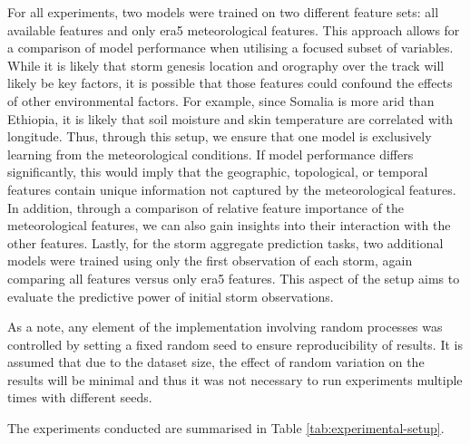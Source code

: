 For all experiments, two models were trained on two different feature sets: all available features and only \acrshort{era5} meteorological features. This approach allows for a comparison of model performance when utilising a focused subset of variables. While it is likely that storm genesis location and orography over the track will likely be key factors, it is possible that those features could confound the effects of other environmental factors. For example, since Somalia is more arid than Ethiopia, it is likely that soil moisture and skin temperature are correlated with longitude. Thus, through this setup, we ensure that one model is exclusively learning from the meteorological conditions. If model performance differs significantly, this would imply that the geographic, topological, or temporal features contain unique information not captured by the meteorological features. In addition, through a comparison of relative feature importance of the meteorological features, we can also gain insights into their interaction with the other features. Lastly, for the storm aggregate prediction tasks, two additional models were trained using only the first observation of each storm, again comparing all features versus only \acrshort{era5} features. This aspect of the setup aims to evaluate the predictive power of initial storm observations.

As a note, any element of the implementation involving random processes was controlled by setting a fixed random seed to ensure reproducibility of results. It is assumed that due to the dataset size, the effect of random variation on the results will be minimal and thus it was not necessary to run experiments multiple times with different seeds.

The experiments conducted are summarised in Table \ref{tab:experimental-setup}.

